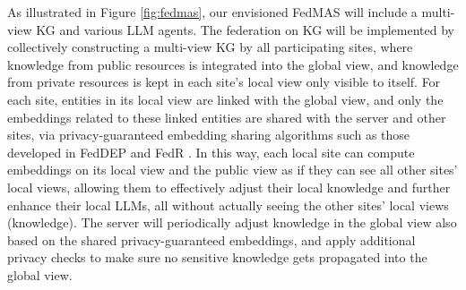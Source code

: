 As illustrated in Figure \ref{fig:fedmas}, our envisioned FedMAS will include a multi-view KG and various LLM agents. The federation on KG will be implemented by collectively constructing a multi-view KG by all participating sites, where knowledge from public resources is integrated into the global view, and knowledge from private resources is kept in each site's local view only visible to itself. For each site, entities in its local view are linked with the global view, and only the embeddings related to these linked entities are shared with the server and other sites, via privacy-guaranteed embedding sharing algorithms such as those developed in FedDEP \cite{zhang2024deep} and FedR \cite{zhang2022efficient}. In this way, each local site can compute embeddings on its local view and the public view as if they can see all other sites' local views, allowing them to effectively adjust their local knowledge and further enhance their local LLMs, all without actually seeing the other sites' local views (knowledge). The server will periodically adjust knowledge in the global view also based on the shared privacy-guaranteed embeddings, and apply additional privacy checks to make sure no sensitive knowledge gets propagated into the global view.


